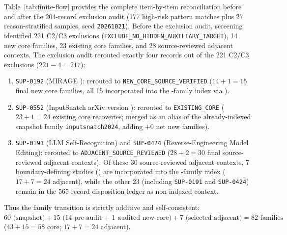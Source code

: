 Table~\ref{tab:finite-flow} provides the complete item-by-item reconciliation before and after the 204-record exclusion audit (177 high-risk pattern matches plus 27 reason-stratified samples, seed \texttt{20261021}). Before the exclusion audit, screening identified 221 C2/C3 exclusions (\texttt{EXCLUDE\_NO\_HIDDEN\_AUXILIARY\_TARGET}), 14 new core families, 23 existing core families, and 28 source-reviewed adjacent contexts. The exclusion audit rerouted exactly four records out of the 221 C2/C3 exclusions ($221-4=217$):
\begin{enumerate}
\item \texttt{SUP-0192} (MIRAGE \cite{revankar2026mirage}): rerouted to \texttt{NEW\_CORE\_SOURCE\_VERIFIED} ($14+1=15$ final new core families, all 15 incorporated into the \FinalN{}-family index via ).
\item \texttt{SUP-0552} (InputSnatch arXiv version \cite{inputsnatch2024}): rerouted to \texttt{EXISTING\_CORE} ($23+1=24$ existing core recoveries; merged as an alias of the already-indexed snapshot family \texttt{inputsnatch2024}, adding $+0$ net new families).
\item \texttt{SUP-0191} (LLM Self-Recognition) and \texttt{SUP-0424} (Reverse-Engineering Model Editing): rerouted to \texttt{ADJACENT\_SOURCE\_REVIEWED} ($28+2=30$ final source-reviewed adjacent contexts). Of these 30 source-reviewed adjacent contexts, 7 boundary-defining studies () are incorporated into the \FinalN{}-family index ($17+7=24$ adjacent), while the other 23 (including \texttt{SUP-0191} and \texttt{SUP-0424}) remain in the 565-record disposition ledger as non-indexed context.
\end{enumerate}
Thus the family transition is strictly additive and self-consistent: $60\text{ (snapshot)} + 15\text{ (14 pre-audit + 1 audited new core)} + 7\text{ (selected adjacent)} = 82\text{ families}$ ($43+15=58$ core; $17+7=24$ adjacent).

